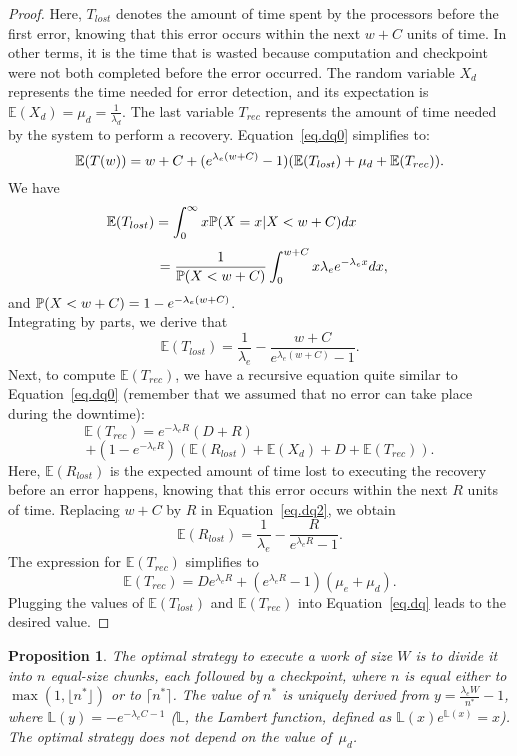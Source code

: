 \documentclass[10pt,table]{article}
\newtheorem{proposition}{Proposition}
\newcommand{\ema}[1]{\ensuremath{#1}\xspace}
\newcommand{\E}{\mathbb{E}}
\newcommand{\Xlost}{\ema{T_{lost}}}
\newcommand{\Xrec}{\ema{T_{rec}}}
\newcommand{\Rlost}{\ema{R_{lost}}}
\newcommand{\www}{\ema{w}}
\newcommand{\WWW}{\ema{W}}
\newcommand{\lambdae}{\ema{\lambda_{e}}}
\newcommand{\lambdad}{\ema{\lambda_{d}}}
\newcommand{\mue}{\ema{\mu_{e}}}
\newcommand{\mud}{\ema{\mu_{d}}}
\newcommand{\ccc}{\ema{C}}
\newcommand{\rrr}{\ema{R}}
\newcommand{\ddd}{\ema{D}}
\newcommand{\lamb}{\mathbb{L}} \newcommand{\T}{\ensuremath{T}\xspace}
\begin{document}
\begin{proof}
Here, $\Xlost$ denotes the amount of time spent by the processors before the first error, knowing that this
error occurs within the next $\www + \ccc $ units of time. In other terms, it is the
time that is wasted because computation and checkpoint were not both
completed before the error occurred.
The random variable $X_{d}$ represents the time needed for error detection, and its expectation is 
$\E(X_{d})=\mud=\frac{1}{\lambdad}$.
The last variable $\Xrec$ represents the amount of time needed by the
system to perform a recovery. 
Equation~\eqref{eq.dq0} simplifies to:
\begin{equation}
\small \E(\T(\www))= \www+ \ccc+ (e^{\lambdae (\www + \ccc)} -1 ) ( \E(\Xlost)+ \mud+ \E(\Xrec) ).
\label{eq.dq}
\end{equation}
We have 
{\small 
$$\E(\Xlost) =   \int_0^{\infty} x \PP(X=x|X < \www+\ccc) dx \quad \quad\quad \quad$$
$$\quad \quad= \frac{1}{\PP(X < \www+\ccc)}\int_0^{\www+\ccc} x \lambdae e^{-\lambdae x} dx,$$}
 and $\PP(X < \www+\ccc) =  1-e^{-\lambdae (\www+\ccc)}$.  \\ 
Integrating by parts, we derive that 
\begin{equation}
\E(\Xlost) =  \frac{1}{\lambdae} - \frac{\www+\ccc}{e^{\lambdae  (\www + \ccc)} - 1} .
\label{eq.dq2}
\end{equation}
Next, to compute $\E(\Xrec)$, we have a recursive equation quite similar to Equation~\eqref{eq.dq0}
(remember that we assumed that no error can take place during the downtime):
{\small $$\E(\Xrec)  =  e^{-\lambdae \rrr} (\ddd+\rrr) \quad \quad\quad \quad\quad \quad\quad \quad \quad\quad \quad\quad \quad$$
$$+ (1-e^{-\lambdae \rrr})  (\E(\Rlost) + \E(X_{d}) + \ddd+\E(\Xrec)).$$}
Here, $\E(\Rlost)$ is the expected amount of time lost to executing
the recovery before an error happens, knowing that this
error occurs within the next $\rrr$ units of time. Replacing $\www+\ccc$ by $\rrr$ in Equation~\eqref{eq.dq2},
we obtain
$$\E(\Rlost) =  \frac{1}{\lambdae} - \frac{\rrr}{e^{\lambdae  \rrr} - 1}.$$
The expression for  
$\E(\Xrec)$ simplifies to
\begin{equation}
\E(\Xrec) = \ddd e^{ \lambdae \rrr}  +  (e^{\lambdae \rrr} - 1)(\mue + \mud).
\label{eq.dq3}
\end{equation}
Plugging the values of $\E(\Xlost)$ and $\E(\Xrec)$  into Equation~\eqref{eq.dq} leads to the desired value.
\end{proof}

\begin{proposition}
\label{th.work2}
The optimal strategy to execute a work of size \WWW is to divide it into $n$ equal-size
chunks, each followed by a checkpoint, where $n$ is equal either to  $\max(1,\lfloor n^{*} \rfloor)$ or
to $\lceil n^{*} \rceil$. The value of $n^{*}$ is uniquely derived from $y= \frac{\lambdae \WWW}{n^{*}}-1$, where $\lamb(y) = -e^{-\lambdae \ccc -1}$ ($\lamb$, the Lambert function, 
defined as $\lamb(x)e^{\lamb(x)}=x$).
The optimal strategy does not depend on the value of~\mud.
\end{proposition}
\end{document}
